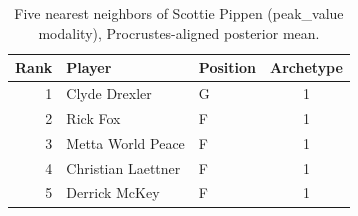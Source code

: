 \begin{table}[htbp]
  \centering\small
  \begin{tabular}{rllc}
    \toprule
    Rank & Player & Position & Archetype \\
    \midrule
    1 & Clyde Drexler & G & 1 \\
    2 & Rick Fox & F & 1 \\
    3 & Metta World Peace & F & 1 \\
    4 & Christian Laettner & F & 1 \\
    5 & Derrick McKey & F & 1 \\
    \bottomrule
  \end{tabular}
  \caption{Five nearest neighbors of Scottie Pippen (peak_value modality), Procrustes-aligned posterior mean.}
  \label{tab:Scottie_Pippen_neighbors_peak_value}
\end{table}


